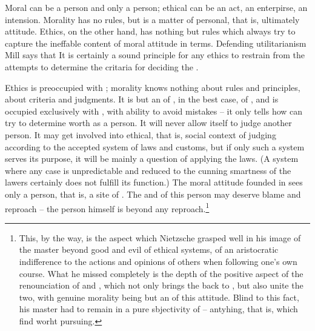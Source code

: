 {{Moral can be a person and only a person; ethical can be an act, an
enterpirse, an intension.  Morality has no  rules, but is
a matter of personal, that is, ultimately  attitude. 
Ethics, on the other hand, has nothing but rules which always try to
capture the ineffable content of moral attitude in  terms. 
Defending utilitarianism Mill says that  It is
certainly a sound principle for any ethics to restrain from the
attempts to determine the critaria for deciding the .

\pa Ethics is preoccupied with ; morality knows nothing
about rules and principles, about criteria and judgments.  It is but 
an  of \yes, in the best case, of
 , and is occupied exclusively with ,
with  ability to avoid mistakes -- it only tells how  can
try to determine  worth as a person.  It will never allow
itself to judge another person.  It may get involved into ethical,
that is, social context of judging according to the accepted system of
laws and customs, but if only such a system serves its purpose, it
will be mainly a question of applying the laws.  (A system where any
case is unpredictable and reduced to the cunning smartness of the
lawers certainly does not fulfill its function.)  The moral attitude
founded in  sees only a person, that is, a site of
.  The  and  of this person
may deserve blame and reproach -- the person himself is
beyond any reproach.\footnote{This, by the way, is the aspect which
Nietzsche grasped well in his image of the master beyond good and evil
of ethical systems, of an aristocratic indifference to the actions and
opinions of others when following one's own course.  What he missed
completely is the depth of the positive aspect of the renounciation of
 and , which not only brings the 
back to , but also unite the two, with genuine morality 
being but an  of this 
attitude.  Blind to this fact, his master had to remain in a pure
sbjectivity of  -- antyhing, that is, which 
find worht pursuing.  }

}}
